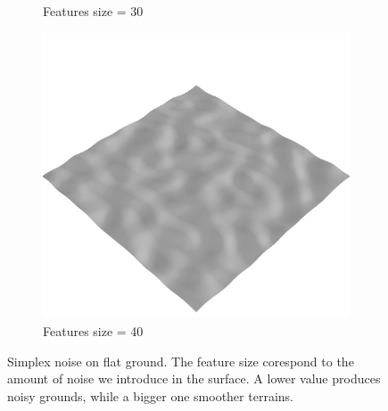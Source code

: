 \documentclass[../document.tex]{subfiles}
\begin{document}
\begin{figure}[htbp]
\begin{subfigure}[b]{0.23\textwidth}
            \caption{Features size = 30}
        \end{subfigure}    
        \begin{subfigure}[b]{0.23\textwidth}
            \includegraphics[width=\textwidth]{../img/data-aug/3d/simplex4.png}
            \caption{Features size = 40}
        \end{subfigure}    
    \caption{Simplex noise on flat ground. The feature size corespond to the amount of noise we introduce in the surface. A lower value produces noisy grounds, while a bigger one smoother terrains.}    
    \label{fig: simplex-noise}

\end{figure}
\end{document}
